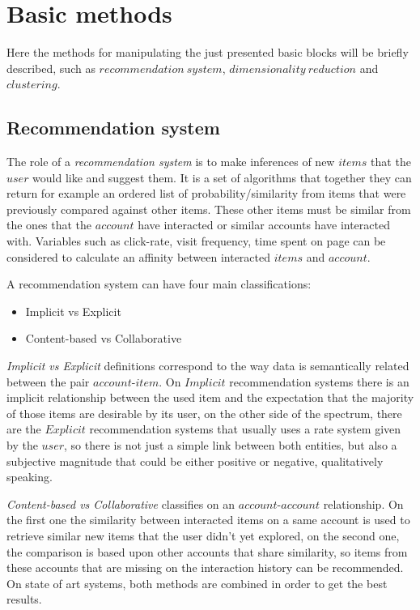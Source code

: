 \documentclass[ecp,tc,english]{iiufrgs}
\begin{document}
    \section{Basic methods}
    Here the methods for manipulating the just presented basic blocks will be briefly described, such as \(recommendation\ system\), \(dimensionality\ reduction\) and \(clustering\).
    
        \subsection{Recommendation system}
        The role of a \textit{recommendation system} is to make inferences of new \(items\) that the \(user\) would like and suggest them. It is a set of algorithms that together they can return for example an ordered list of probability/similarity from items that were previously compared against other items. These other items must be similar from the ones that the \(account\) have interacted or similar accounts have interacted with.
        Variables such as click-rate, visit frequency, time spent on page can be considered to calculate an affinity between interacted \(items\) and \(account\).

        A recommendation system can have four main classifications:
        \begin{itemize} 
            \item Implicit vs Explicit
            \item Content-based vs Collaborative
        \end{itemize}

        \textit{Implicit vs Explicit} definitions correspond to the way data is semantically related between the pair \(account\)-\(item\). On \(Implicit\) recommendation systems there is an implicit relationship between the used item and the expectation that the majority of those items are desirable by its user, on the other side of the spectrum, there are the \(Explicit\) recommendation systems that usually uses a rate system given by the \(user\), so there is not just a simple link between both entities, but also a subjective magnitude that could be either positive or negative, qualitatively speaking.

        \textit{Content-based vs Collaborative} classifies on an \(account\)-\(account\) relationship. On the first one the similarity between interacted items on a same account is used to retrieve similar new items that the user didn't yet explored, on the second one, the comparison is based upon other accounts that share similarity, so items from these accounts that are missing on the interaction history can be recommended. On state of art systems, both methods are combined in order to get the best results.    
        
\end{document}
